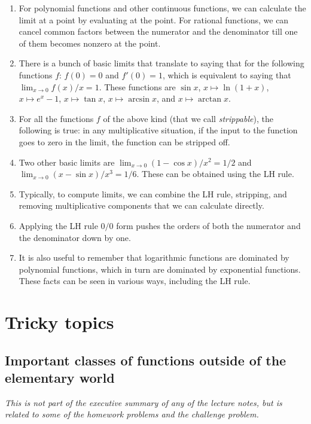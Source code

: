 \documentclass[10pt]{amsart}
\begin{document}
\begin{enumerate}
\item For polynomial functions and other continuous functions, we can
  calculate the limit at a point by evaluating at the point. For
  rational functions, we can cancel common factors between the
  numerator and the denominator till one of them becomes nonzero at
  the point.
\item There is a bunch of basic limits that translate to saying that
  for the following functions $f$: $f(0) = 0$ and $f'(0) = 1$, which
  is equivalent to saying that $\lim_{x \to 0} f(x)/x = 1$. These
  functions are $\sin x$, $x \mapsto \ln(1 + x)$, $x \mapsto e^x - 1$,
  $x \mapsto \tan x$, $x \mapsto \arcsin x$, and $x \mapsto \arctan
  x$.
\item For all the functions $f$ of the above kind (that we call {\em
  strippable}), the following is true: in any multiplicative
  situation, if the input to the function goes to zero in the limit,
  the function can be stripped off.
\item Two other basic limits are $\lim_{x \to 0} (1 - \cos x)/x^2 =
  1/2$ and $\lim_{x \to 0} (x - \sin x)/x^3 = 1/6$. These can be
  obtained using the LH rule.
\item Typically, to compute limits, we can combine the LH rule,
  stripping, and removing multiplicative components that we can
  calculate directly.
\item Applying the LH rule $0/0$ form pushes the orders of both the
  numerator and the denominator down by one.
\item It is also useful to remember that logarithmic functions are
  dominated by polynomial functions, which in turn are dominated by
  exponential functions. These facts can be seen in various ways,
  including the LH rule.
\end{enumerate}

\section{Tricky topics}

\subsection{Important classes of functions outside of the elementary world}

{\em This is not part of the executive summary of any of the lecture
notes, but is related to some of the homework problems and the
challenge problem.}
\end{document}

